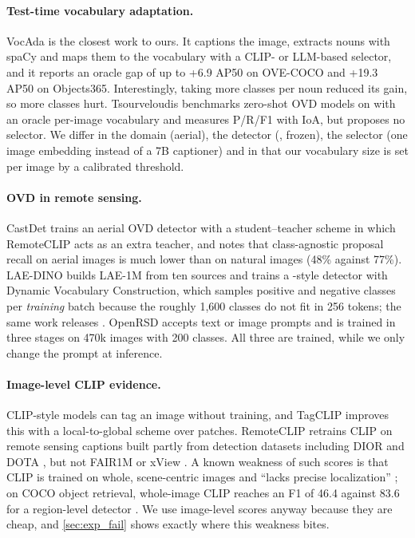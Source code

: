 \paragraph{Test-time vocabulary adaptation.}
VocAda \cite{liu2025vocada} is the closest work to ours.
It captions the image, extracts nouns with spaCy and maps them to the vocabulary with a CLIP- or LLM-based selector, and it reports an oracle gap of up to +6.9 AP50 on OVE-COCO and +19.3 AP50 on Objects365.
Interestingly, taking more classes per noun reduced its gain, so more classes hurt.
Tsourveloudis \cite{tsourveloudis2026ovd} benchmarks zero-shot OVD models on \lae with an oracle per-image vocabulary and measures P/R/F1 with IoA, but proposes no selector.
We differ in the domain (aerial), the detector (\gdino, frozen), the selector (one image embedding instead of a 7B captioner) and in that our vocabulary size is set per image by a calibrated threshold.

\paragraph{OVD in remote sensing.}
CastDet \cite{li2024castdet} trains an aerial OVD detector with a student--teacher scheme in which RemoteCLIP acts as an extra teacher, and notes that class-agnostic proposal recall on aerial images is much lower than on natural images (48\% against 77\%).
LAE-DINO \cite{pan2025lae} builds LAE-1M from ten sources and trains a \gdino-style detector with Dynamic Vocabulary Construction, which samples positive and negative classes per \emph{training} batch because the roughly 1,600 classes do not fit in 256 tokens; the same work releases \lae.
OpenRSD \cite{huang2025openrsd} accepts text or image prompts and is trained in three stages on 470k images with 200 classes.
All three are trained, while we only change the prompt at inference.

\paragraph{Image-level CLIP evidence.}
CLIP-style models can tag an image without training, and TagCLIP \cite{lin2024tagclip} improves this with a local-to-global scheme over patches.
RemoteCLIP \cite{liu2024remoteclip} retrains CLIP on remote sensing captions built partly from detection datasets including DIOR \cite{li2020dior} and DOTA \cite{xia2018dota}, but not FAIR1M \cite{sun2022fair1m} or xView \cite{lam2018xview}.
A known weakness of such scores is that CLIP is trained on whole, scene-centric images and ``lacks precise localization'' \cite{rasheed2022bridging}; on COCO object retrieval, whole-image CLIP reaches an F1 of 46.4 against 83.6 for a region-level detector \cite{fu2026wedetect}.
We use image-level scores anyway because they are cheap, and \cref{sec:exp_fail} shows exactly where this weakness bites.
